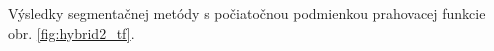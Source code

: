 \documentclass[a4paper,11pt,oneside]{article}%
\begin{document}
Výsledky segmentačnej metódy s počiatočnou podmienkou prahovacej funkcie obr. \ref{fig:hybrid2_tf}.

\begin{figure}[H]  
    \hspace{5px}

\end{figure}
\end{document}

